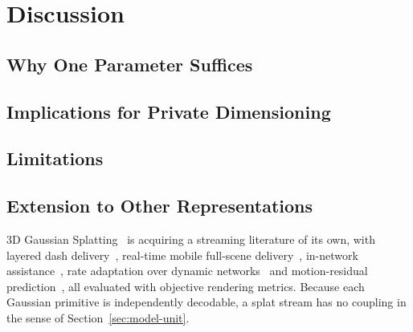 \section{Discussion}
\label{sec:discussion}

\subsection{Why One Parameter Suffices}

\subsection{Implications for Private \fiveg Dimensioning}

\subsection{Limitations}

\subsection{Extension to Other Representations}
\label{sec:model-predict}
 3D Gaussian
Splatting~\cite{kerbl2023gaussian} is acquiring a streaming literature
of its own, with layered \gls{dash} delivery~\cite{sun2025lts},
real-time mobile full-scene delivery~\cite{vega2025mobicom},
in-network assistance~\cite{krishna2025netsplat}, rate adaptation over
dynamic networks~\cite{wang2026tcsvt} and motion-residual
prediction~\cite{naqvi2026cubegs}, all evaluated with objective
rendering metrics. Because each Gaussian primitive is independently
decodable, a splat stream has no \gof coupling in the sense of
Section~\ref{sec:model-unit}. 
